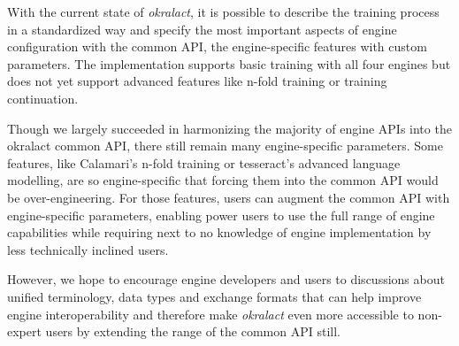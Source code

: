 \documentclass[conference]{IEEEtran}
\begin{document}
With the current state of \textit{okralact}, it is possible to describe the
training process in a standardized way and specify the most important aspects 
of engine configuration with the common API, the engine-specific features with custom
parameters. The implementation supports basic training with all four engines
but does not yet support advanced features like n-fold training or training
continuation.




Though we largely succeeded in harmonizing the majority of engine APIs into the
okralact common API, there still remain many engine-specific parameters. Some
features, like Calamari's n-fold training or tesseract's advanced language
modelling, are so engine-specific that forcing them into the common API would
be over-engineering. For those features, users can augment the common API
with engine-specific parameters, enabling power users to use the full range of
engine capabilities while requiring next to no knowledge of engine implementation
by less technically inclined users.

However, we hope to encourage engine developers and
users to discussions about unified terminology, data types and exchange 
formats that can help improve engine interoperability and therefore 
make \textit{okralact} even more accessible to non-expert users by extending
the range of the common API still.



\end{document}
